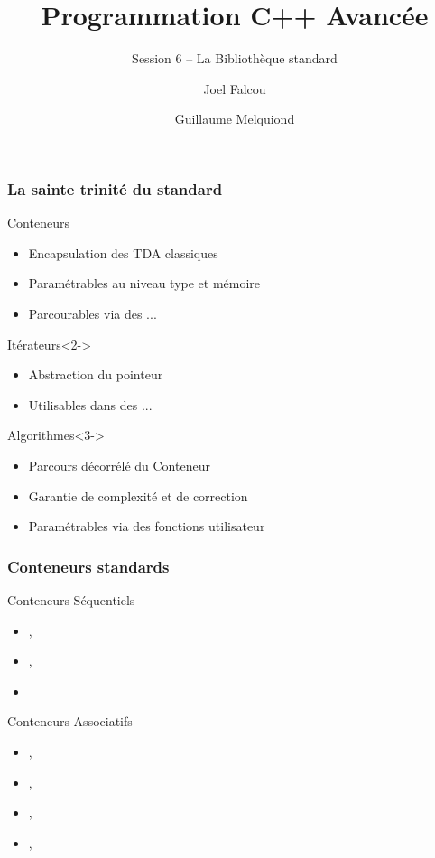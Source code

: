 \documentclass[svgnames]{beamer}
\title{Programmation C++ Avancée}
\subtitle{Session 6 -- La Bibliothèque standard}
\author{Joel Falcou \and Guillaume Melquiond}
\institute{Laboratoire de Recherche en Informatique}
\date{}
\begin{document}


\begin{frame}[plain]
\titlepage
\end{frame}
\setcounter{framenumber}{0}
\frame
{
  \frametitle{La sainte trinité du standard}
  \begin{block}{Conteneurs}
  \begin{itemize}\footnotesize
  \item Encapsulation des TDA classiques
  \item Paramétrables au niveau type et mémoire
  \item Parcourables via des ...
  \end{itemize}
  \end{block}{}
  \begin{block}{Itérateurs}<2->
  \begin{itemize}\footnotesize
  \item Abstraction du pointeur
  \item Utilisables dans des ...
  \end{itemize}
  \end{block}{}
  \begin{block}{Algorithmes}<3->
  \begin{itemize}\footnotesize
  \item Parcours décorrélé du Conteneur
  \item Garantie de complexité et de correction
  \item Paramétrables via des fonctions utilisateur
  \end{itemize}
  \end{block}{}
}

\frame
{
  \frametitle{Conteneurs standards}
  \begin{block}{Conteneurs Séquentiels}
  \begin{itemize}
  \item {}, 
  \item {}, 
  \item {}
  \end{itemize}
  \end{block}{}

  \begin{block}{Conteneurs Associatifs}
  \begin{itemize}
  \item {}, 
  \item {}, 
  \item {}, 
  \item {}, 
  \end{itemize}
  \end{block}{}
}
\end{document}
